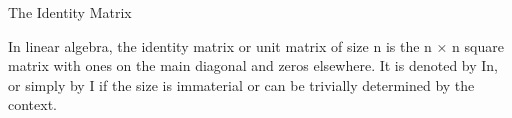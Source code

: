 
The Identity Matrix

In linear algebra, the identity matrix or unit matrix of size n is the n × n square matrix with ones on the main diagonal and zeros elsewhere. It is denoted by In, or simply by I if the size is immaterial or can be trivially determined by the context.


